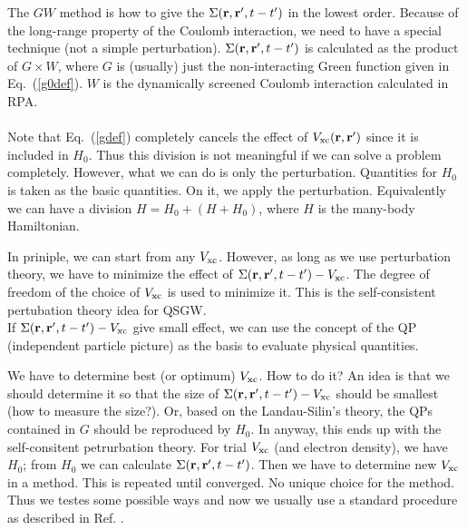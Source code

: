 \documentclass[a4paper,10pt,epsf,fleqn]{article}
\newcommand{\bfr}{{\bf r}}
\newcommand{\req}[1]{\mbox{Eq.~(\ref{#1})}}
\begin{document}
The $GW$ method is how to give the $\Sigma(\bfr,\bfr',t-t')$ in the lowest order.
Because of the long-range property of the Coulomb interaction, we need
to have a special technique (not a simple perturbation). 
$\Sigma(\bfr,\bfr',t-t')$ is calculated as the product of $G \times W$, where $G$
is (usually) just the non-interacting Green function given in \req{g0def}.
$W$ is the dynamically screened Coulomb interaction calculated in RPA.\\

\\
Note that \req{gdef} completely cancels the effect of 
$V_{\rm xc}(\bfr,\bfr')$ since it is included in $H_0$.
Thus this division is not meaningful if we can solve a problem completely.
However, what we can do is only the perturbation.
Quantities for $H_0$ is taken as the basic quantities. On it, we apply the perturbation.
Equivalently we can have a division $H=H_0+(H+H_0)$, where $H$ is the
many-body Hamiltonian. 

In priniple, we can start from any $V_{\rm xc}$. However,
as long as we use perturbation theory, we have to minimize 
the effect of $\Sigma(\bfr,\bfr',t-t')-V_{\rm xc}$.
The degree of freedom of the choice of $V_{\rm xc}$ is used 
to minimize it. This is the self-consistent pertubation theory idea for QSGW.\\

If $\Sigma(\bfr,\bfr',t-t')-V_{\rm xc}$ 
give small effect, we can use the concept of the QP
(independent particle picture) as the basis to evaluate physical
quantities.

We have to determine best (or optimum) $V_{\rm xc}$. How to do it?
An idea is that we should determine it so that 
the size of $\Sigma(\bfr,\bfr',t-t')-V_{\rm xc}$ should be smallest 
(how to measure the size?).
Or, based on the Landau-Silin's theory, 
the QPs contained in $G$ should be reproduced by $H_0$.
In anyway, this ends up with the self-consitent petrurbation theory.
For trial $V_{\rm xc}$ (and electron density), we have $H_0$; from $H_0$
we can calculate $\Sigma(\bfr,\bfr',t-t')$. Then we have to
determine new $V_{\rm xc}$ in a method. This is repeated until converged.
No unique choice for the method. Thus we testes some possible ways
and now we usually use a standard procedure as described in Ref.
 \cite{kotani_quasiparticle_2014}.


\newpage
\end{document}
